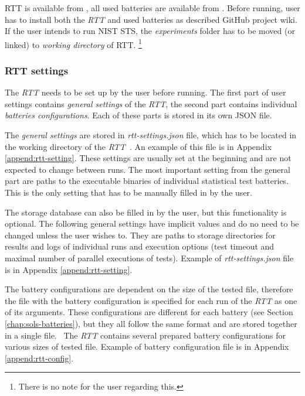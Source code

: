 \documentclass[
  digital,     %
  oneside,     %
  nosansbold,  %
  nocolorbold, %
  nolof,         %
  nolot,         %
]{fithesis4}
\begin{document}
\pagebreak

RTT is available from \cite{rtt-site}, all used batteries are available from \cite{rtt-batteries}. Before running, user has to install both the \emph{RTT} and used batteries as described GitHub project wiki. If the user intends to run NIST STS, the \emph{experiments} folder has to be moved (or linked) to \emph{working directory} of RTT. \footnote{There is no note for the user regarding this.}

\subsubsection{RTT settings}\label{rtt-settings} 
The \emph{RTT} needs to be set up by the user before running. The first part of user settings contains \emph{general settings} of the \emph{RTT}, the second part contains individual \emph{batteries configurations}. Each of these parts is stored in its own JSON file. 

The \emph{general settings} are stored in \emph{rtt-settings.json} file, which has to be located in the working directory of the \emph{RTT}~\cite[p.~10]{rtt-obratil}. An example of this file is in Appendix \ref{append:rtt-setting}. These settings are usually set at the beginning and are not expected to change between runs. The most important setting from the general part are paths to the executable binaries of individual statistical test batteries. This is the only setting that has to be manually filled in by the user.

The storage database can also be filled in by the user, but this functionality is optional. The following general settings have implicit values and do no need to be changed unless the user wishes to. They are paths to storage directories for results and logs of individual runs and execution options (test timeout and maximal number of parallel executions of tests). Example of \emph{rtt-settings.json} file is in Appendix \ref{append:rtt-setting}.

The battery configurations are dependent on the size of the tested file, therefore the file with the battery configuration is specified for each run of the \emph{RTT} as one of its arguments. These configurations are different for each battery (see Section \ref{chap:sols-batteries}), but they all follow the same format and are stored together in a single file.~\cite[p.~11]{rtt-obratil} The \emph{RTT} contains several prepared battery configurations for various sizes of tested file. Example of battery configuration file is in Appendix \ref{append:rtt-config}.
\end{document}
